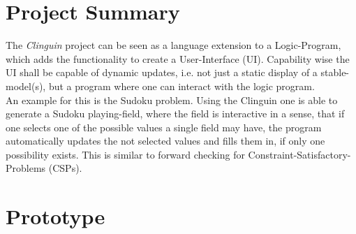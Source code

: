 \documentclass[12pt,a4paper]{article}
\newcommand{\<}[1]{\guilsinglleft}
\renewcommand{\>}[1]{\guilsinglright}
\newcommand{\name}{Alexander Beiser}
\newcommand{\matriculation}{To: The masses}
\begin{document}
\thispagestyle{empty}
\noindent{}
\vspace{0.5cm}





\section{Project Summary}

\noindent The \textit{Clinguin} project can be seen as a language extension to a Logic-Program, which adds the functionality to create a User-Interface (UI). Capability wise the UI shall be capable of dynamic updates, i.e. not just a static display of a stable-model(s), but a program where one can interact with the logic program.\\
An example for this is the Sudoku problem. Using the Clinguin one is able to generate a Sudoku playing-field, where the field is interactive in a sense, that if one selects one of the possible values a single field may have, the program automatically updates the not selected values and fills them in, if only one possibility exists. This is similar to forward checking for Constraint-Satisfactory-Problems (CSPs).\\

\section{Prototype}
\end{document}
